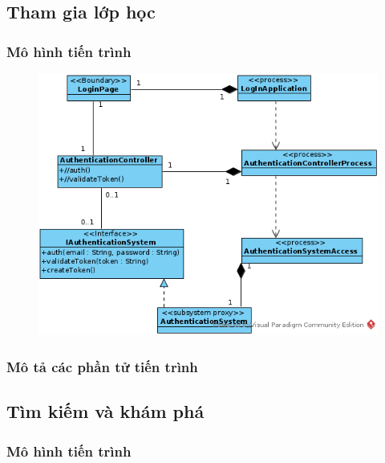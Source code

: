 \documentclass[./../main_file.tex]{subfiles}
\begin{document}
\subsection{Tham gia lớp học}

\subsubsection{Mô hình tiến trình}

\begin{figure}[H]
	\centering
	\includegraphics[width=\linewidth]{./images/pv_login.png}
\end{figure}

\subsubsection{Mô tả các phần tử tiến trình}

\subsection{Tìm kiếm và khám phá}

\subsubsection{Mô hình tiến trình}
\end{document}
